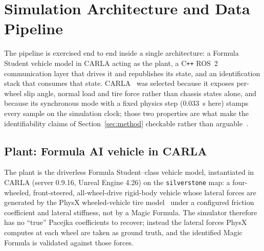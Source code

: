 \section{Simulation Architecture and Data Pipeline}
\label{sec:platform}

The pipeline is exercised end to end inside a single architecture: a Formula
Student vehicle model in CARLA acting as the plant, a C\texttt{++} ROS~2
communication layer that drives it and republishes its state, and an
identification stack that consumes that state. CARLA~\cite{carla2017} was
selected because it exposes per-wheel slip angle, normal load and tire force
rather than chassis states alone, and because its synchronous mode with a fixed
physics step (\SI{0.033}{\second} here) stamps every sample on the simulation
clock; those two properties are what make the identifiability claims of
Section~\ref{sec:method} checkable rather than
arguable~\cite{kaur2021simsurvey}.

\subsection{Plant: Formula AI vehicle in CARLA}
\label{subsec:platform}

The plant is the driverless Formula Student--class vehicle model, instantiated
in CARLA (server 0.9.16, Unreal Engine 4.26) on the \texttt{silverstone} map: a
four-wheeled, front-steered, all-wheel-drive rigid-body vehicle whose lateral
forces are generated by the PhysX wheeled-vehicle tire
model~\cite{physxvehicle} under a configured friction coefficient and lateral
stiffness, not by a Magic Formula. The simulator therefore has no ``true''
Pacejka coefficients to recover; instead the lateral forces PhysX computes at
each wheel are taken as ground truth, and the identified Magic Formula is
validated against those forces.

